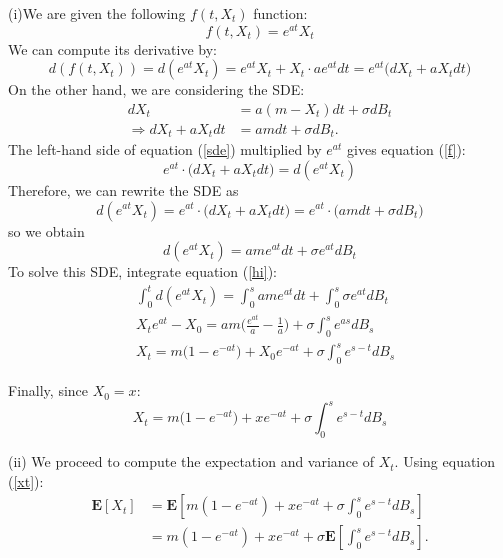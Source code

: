 \documentclass[12pt]{article}
\begin{document}
(i)We are given the following $f(t,X_t)$ function:
\begin{equation}
f(t,X_t)= e^{at}X_t
\end{equation}
We can compute its derivative by:
\begin{equation} \label{f}
d(f(t,X_t)) = d(e^{at}X_t) = e^{at}X_t+X_t\cdot a e^{at}dt = e^{at} \bigg(dX_t + aX_t dt \bigg)
\end{equation}
On the other hand, we are considering the SDE:
\begin{align}
dX_t &= a(m-X_t)dt + \sigma dB_t \\
\label{sde}
\Rightarrow dX_t + aX_tdt &= amdt+\sigma dB_t.
\end{align}
The left-hand side of equation (\ref{sde}) multiplied by $e^{at}$ gives equation (\ref{f}):
\begin{equation}
e^{at} \cdot \bigg(dX_t + aX_tdt \bigg) = d(e^{at}X_t)
\end{equation}
Therefore, we can rewrite the SDE as
\begin{equation}
 d(e^{at}X_t) = e^{at} \cdot \bigg(dX_t + aX_tdt \bigg)  = e^{at} \cdot \bigg( amdt+\sigma dB_t \bigg)
\end{equation}
so we obtain
\begin{equation}\label{hi}
 d(e^{at}X_t) = ame^{at}dt+\sigma e^{at} dB_t 
\end{equation}
To solve this SDE, integrate equation (\ref{hi}):
\begin{align}
& \int_0^t d(e^{at}X_t) = \int_0^s  ame^{at}dt+\int_0^s \sigma e^{at} dB_t \\
& X_te^{at}-X_0  = am\bigg(\frac{e^{at}}{a} - \frac{1}{a}\bigg) + \sigma \int_0^s e^{as}dB_s \\
& X_t = m\bigg(1-e^{-at}\bigg) + X_0 e^{-at} + \sigma \int_0^s e^{s-t}dB_s 
\end{align}

Finally, since $X_0=x$:
\begin{equation}\label{xt}
\boxed{X_t = m\bigg(1-e^{-at}\bigg) + x e^{-at} + \sigma \int_0^s e^{s-t}dB_s }
\end{equation}

(ii) We proceed to compute the expectation and variance of $X_t$. Using equation (\ref{xt}):
\begin{align}
\mathbf{E}[X_t] &= \mathbf{E}\left[m(1-e^{-at}) + x e^{-at}  + \sigma \int_0^s e^{s-t}dB_s \right] \\
&= m(1-e^{-at}) + x e^{-at} + \sigma \mathbf{E}\left[ \int_0^s e^{s-t}dB_s \right].
\end{align}
\end{document}

